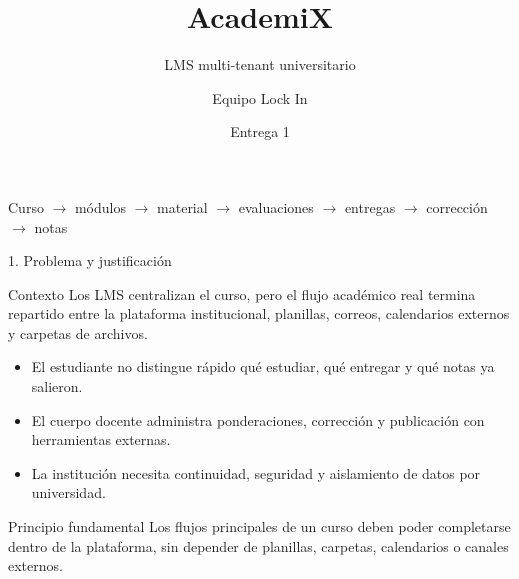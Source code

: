 \documentclass[aspectratio=169,10pt]{beamer}
\title[AcademiX]{AcademiX}
\subtitle{LMS multi-tenant universitario}
\author[Equipo Lock In]{Equipo Lock In}
\institute[IIC3143]{IIC3143 Desarrollo de Software}
\date{Entrega 1}
\begin{document}
\begin{frame}
  \titlepage
  \vspace{-0.5cm}
  \centering
  \small Curso $\rightarrow$ módulos $\rightarrow$ material $\rightarrow$ evaluaciones $\rightarrow$ entregas $\rightarrow$ corrección $\rightarrow$ notas
\end{frame}

\begin{frame}{1. Problema y justificación}
\begin{block}{Contexto}
Los LMS centralizan el curso, pero el flujo académico real termina repartido entre la plataforma institucional, planillas, correos, calendarios externos y carpetas de archivos.
\end{block}
\begin{itemize}
  \item El estudiante no distingue rápido qué estudiar, qué entregar y qué notas ya salieron.
  \item El cuerpo docente administra ponderaciones, corrección y publicación con herramientas externas.
  \item La institución necesita continuidad, seguridad y aislamiento de datos por universidad.
\end{itemize}
\vspace{0.1cm}
\begin{block}{Principio fundamental}
\footnotesize Los flujos principales de un curso deben poder completarse dentro de la plataforma, sin depender de planillas, carpetas, calendarios o canales externos.
\end{block}
\end{frame}
\end{document}
